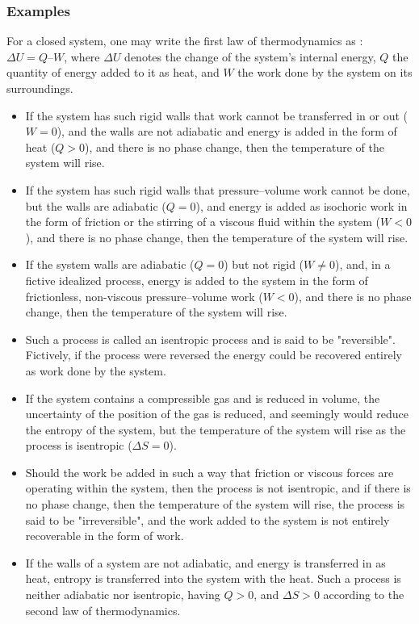 \documentclass[]{article}
\begin{document}
\subsubsection{Examples}
For a closed system, one may write the first law of thermodynamics as : $\Delta U = Q – W$, where $\Delta U$ denotes the change of the system's internal energy, $Q$ the quantity of energy added to it as heat, and $W$ the work done by the system on its surroundings.
\begin{itemize}
\item If the system has such rigid walls that work cannot be transferred in or out ($W = 0$), and the walls are not adiabatic and energy is added in the form of heat ($Q > 0$), and there is no phase change, then the temperature of the system will rise.
\item If the system has such rigid walls that pressure–volume work cannot be done, but the walls are adiabatic ($Q = 0$), and energy is added as isochoric work in the form of friction or the stirring of a viscous fluid within the system ($W < 0$), and there is no phase change, then the temperature of the system will rise.
\item If the system walls are adiabatic ($Q = 0$) but not rigid ($W \neq 0$), and, in a fictive idealized process, energy is added to the system in the form of frictionless, non-viscous pressure–volume work ($W < 0$), and there is no phase change, then the temperature of the system will rise. 
\item Such a process is called an isentropic process and is said to be "reversible". Fictively, if the process were reversed the energy could be recovered entirely as work done by the system. 
\item If the system contains a compressible gas and is reduced in volume, the uncertainty of the position of the gas is reduced, and seemingly would reduce the entropy of the system, but the temperature of the system will rise as the process is isentropic ($\Delta S = 0$). 
\item Should the work be added in such a way that friction or viscous forces are operating within the system, then the process is not isentropic, and if there is no phase change, then the temperature of the system will rise, the process is said to be "irreversible", and the work added to the system is not entirely recoverable in the form of work.
\item If the walls of a system are not adiabatic, and energy is transferred in as heat, entropy is transferred into the system with the heat. Such a process is neither adiabatic nor isentropic, having $Q > 0$, and $\Delta S > 0$ according to the second law of thermodynamics.

\end{itemize}
\end{document}
